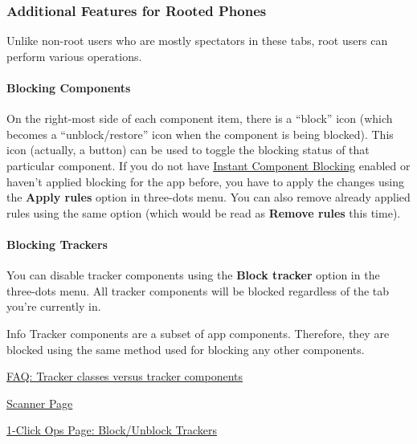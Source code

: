 \subsubsection{Additional Features for Rooted Phones} %
Unlike non-root users who are mostly spectators in these tabs, root users can perform various operations.

\paragraph{Blocking Components} %
On the right-most side of each component item, there is a ``block'' icon (which becomes a ``unblock/restore'' icon when
the component is being blocked). This icon (actually, a button) can be used to toggle the blocking status of that
particular component. If you do not have \hyperref[subsubsec:instant-component-blocking]{Instant Component Blocking}
enabled or haven't applied blocking for the app before, you have to apply the changes using the \textbf{Apply rules}
option in three-dots menu. You can also remove already applied rules using the same option (which would be read as
\textbf{Remove rules} this time).


\paragraph{Blocking Trackers}\label{par:appdetails:blocking-trackers} %
You can disable tracker components using the \textbf{Block tracker} option in the three-dots menu. All tracker
components will be blocked regardless of the tab you're currently in.

\begin{tip}{Info}
    Tracker components are a subset of app components. Therefore, they are blocked using the same method used for
    blocking any other components.
\end{tip}

\begin{amseealso}
    \item \hyperref[subsec:tracker-classes-versus-tracker-components]{FAQ: Tracker classes versus tracker components}
    \item \hyperref[sec:scanner-page]{Scanner Page}
    \item \hyperref[subsec:block-unblock-trackers]{1-Click Ops Page: Block/Unblock Trackers}
\end{amseealso}

